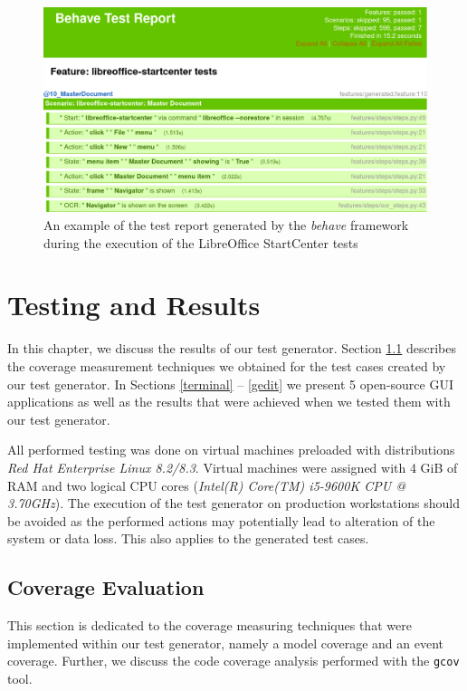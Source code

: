 \begin{figure}[H]
	\centering
	\includegraphics[width=1\textwidth,clip]{obrazky-figures/libreoffice-report.png}
	\caption{An example of the test report generated by the \textit{behave} framework during the execution of the LibreOffice StartCenter tests}
	\label{lo_report_html}
\end{figure}



\chapter{Testing and Results}\label{chapter_4}
In this chapter, we discuss the results of our test generator. Section \ref{coverage} describes the coverage measurement techniques we obtained for the test cases created by our test generator.  In Sections \ref{terminal} -- \ref{gedit} we present 5 open-source GUI applications as well as the results that were achieved when we tested them with our test generator.

All performed testing was done on virtual machines preloaded with distributions \textit{Red Hat Enterprise Linux 8.2/8.3}. Virtual machines were assigned with 4 GiB of RAM and two logical CPU cores (\textit{Intel(R) Core(TM) i5-9600K CPU @ 3.70GHz}). The execution of the test generator on production workstations should be avoided as the performed actions may potentially lead to alteration of the system or data loss.  This also applies to the generated test cases. 


\section{Coverage Evaluation}\label{coverage}
This section is dedicated to the coverage measuring techniques that were implemented within our test generator, namely a model coverage and an event coverage. Further, we discuss the code coverage analysis performed with the \verb|gcov| tool.

